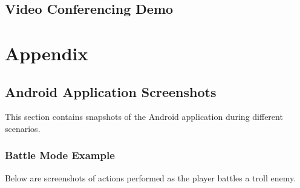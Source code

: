 \documentclass[11pt]{article}
\begin{document}
\subsection{Video Conferencing Demo}












































































\newpage
\section{Appendix}
\subsection{Android Application Screenshots}
This section contains snapshots of the Android application during different scenarios.
\label{appendix:screenshots}
\subsubsection{Battle Mode Example}
\label{appendix:battle-mode-screenshots}
Below are screenshots of actions performed as the player battles a troll enemy.
\end{document}
